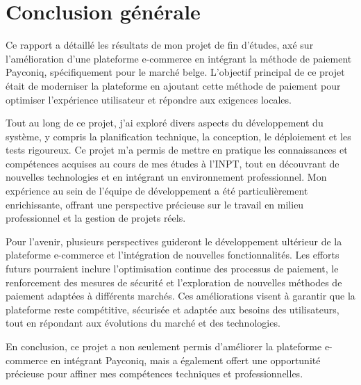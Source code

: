 \chapter*{Conclusion générale}
Ce rapport a détaillé les résultats de mon projet de fin d’études, axé sur l'amélioration d'une plateforme e-commerce en intégrant la méthode de paiement Payconiq, spécifiquement pour le marché belge. L’objectif principal de ce projet était de moderniser la plateforme en ajoutant cette méthode de paiement pour optimiser l’expérience utilisateur et répondre aux exigences locales.

Tout au long de ce projet, j’ai exploré divers aspects du développement du système, y compris la planification technique, la conception, le déploiement et les tests rigoureux. Ce projet m’a permis de mettre en pratique les connaissances et compétences acquises au cours de mes études à l'INPT, tout en découvrant de nouvelles technologies et en intégrant un environnement professionnel. Mon expérience au sein de l’équipe de développement a été particulièrement enrichissante, offrant une perspective précieuse sur le travail en milieu professionnel et la gestion de projets réels.

Pour l’avenir, plusieurs perspectives guideront le développement ultérieur de la plateforme e-commerce et l’intégration de nouvelles fonctionnalités. Les efforts futurs pourraient inclure l’optimisation continue des processus de paiement, le renforcement des mesures de sécurité et l’exploration de nouvelles méthodes de paiement adaptées à différents marchés. Ces améliorations visent à garantir que la plateforme reste compétitive, sécurisée et adaptée aux besoins des utilisateurs, tout en répondant aux évolutions du marché et des technologies.

En conclusion, ce projet a non seulement permis d'améliorer la plateforme e-commerce en intégrant Payconiq, mais a également offert une opportunité précieuse pour affiner mes compétences techniques et professionnelles. 